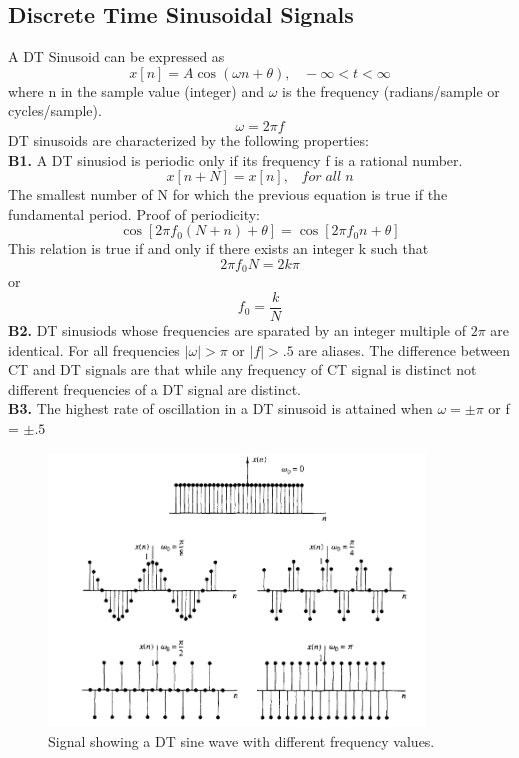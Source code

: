 \documentclass{article} %
\begin{document}
    \subsection{Discrete Time Sinusoidal Signals}
    A DT Sinusoid can be expressed as
    \begin{equation}  
	x[n] = A \cos(\omega n + \theta), \;\;\; -\infty < t < \infty
    \end{equation}
    where n in the sample value (integer) and $\omega$ is the frequency (radians/sample or cycles/sample).
    \begin{equation}  
	\omega = 2 \pi f
    \end{equation}
	DT sinusoids are characterized by the following properties:\\
	\textbf{B1.} A DT sinusiod is periodic only if its frequency f is a rational number.
	\begin{equation}  
	x[n + N] = x[n], \;\;\; for \; all\; n
    \end{equation}
    The smallest number of N for which the previous equation is true if the fundamental period. Proof of periodicity:
    \begin{equation}  
	\cos[2 \pi f_0 (N + n) + \theta] = \cos[2 \pi f_0 n + \theta]
    \end{equation}
    This relation is true if and only if there exists an integer k such that
    \begin{equation}  
	2 \pi f_0 N = 2k \pi
    \end{equation}
    or 
    \begin{equation}  
	f_0 = \frac{k}{N}
    \end{equation}
    \textbf{B2.} DT sinusiods whose frequencies are sparated by an integer multiple of $2\pi$ are identical. For all frequencies $|\omega| > \pi$ or $|f| > .5$ are aliases. The difference between CT and DT signals are that while any frequency of CT signal is distinct not different frequencies of a DT signal are distinct.\\
    \textbf{B3.} The highest rate of oscillation in a DT sinusoid is attained when $\omega = \pm \pi$ or f = $\pm.5$\\
   
    \begin{figure}[h]
    \centering
	\includegraphics[width=10cm]{dt_freq}
	\caption{Signal showing a DT sine wave with different frequency values.}
	\end{figure}
	
\end{document}
